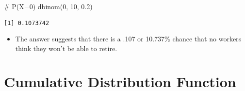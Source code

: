 \documentclass[
  letterpaper,
  DIV=11,
  numbers=noendperiod]{scrreprt}
\newenvironment{Shaded}{\begin{snugshade}}{\end{snugshade}}
\newcommand{\CommentTok}[1]{\textcolor[rgb]{0.37,0.37,0.37}{#1}}
\newcommand{\DecValTok}[1]{\textcolor[rgb]{0.68,0.00,0.00}{#1}}
\newcommand{\FloatTok}[1]{\textcolor[rgb]{0.68,0.00,0.00}{#1}}
\newcommand{\FunctionTok}[1]{\textcolor[rgb]{0.28,0.35,0.67}{#1}}
\newcommand{\NormalTok}[1]{\textcolor[rgb]{0.00,0.23,0.31}{#1}}
\providecommand{\tightlist}{%
  \setlength{\itemsep}{0pt}\setlength{\parskip}{0pt}}\usepackage{longtable,booktabs,array}
\begin{document}
\begin{Shaded}
\begin{Highlighting}[]
\CommentTok{\# P(X=0)}
\FunctionTok{dbinom}\NormalTok{(}\DecValTok{0}\NormalTok{, }\DecValTok{10}\NormalTok{, }\FloatTok{0.2}\NormalTok{)}
\end{Highlighting}
\end{Shaded}

\begin{verbatim}
[1] 0.1073742
\end{verbatim}

\begin{itemize}
\tightlist
\item
  The answer suggests that there is a .107 or 10.737\% chance that no
  workers think they won't be able to retire.
\end{itemize}

\section{Cumulative Distribution
Function}\label{cumulative-distribution-function}
\end{document}
